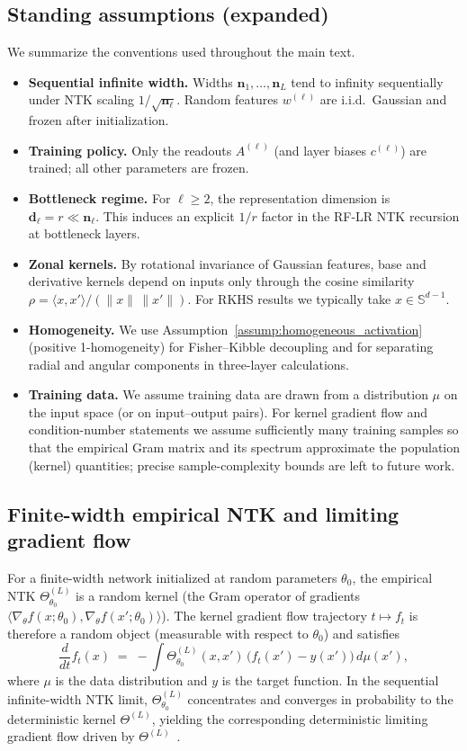 \subsection{Standing assumptions (expanded)}\label{appendix:assumptions-expanded}
We summarize the conventions used throughout the main text.
\begin{itemize}
    \item \textbf{Sequential infinite width.} Widths \(\bm{n}_1,\ldots,\bm{n}_L\) tend to infinity sequentially under NTK scaling \(1/\sqrt{\bm{n}_\ell}\). Random features \(w^{(\ell)}\) are i.i.d.\ Gaussian and frozen after initialization.
    \item \textbf{Training policy.} Only the readouts \(A^{(\ell)}\) (and layer biases \(c^{(\ell)}\)) are trained; all other parameters are frozen.
    \item \textbf{Bottleneck regime.} For \(\ell\ge 2\), the representation dimension is \(\bm{d}_\ell=r\ll \bm{n}_\ell\). This induces an explicit \(1/r\) factor in the RF-LR NTK recursion at bottleneck layers.
    \item \textbf{Zonal kernels.} By rotational invariance of Gaussian features, base and derivative kernels depend on inputs only through the cosine similarity \(\rho=\langle x,x'\rangle/(\|x\|\,\|x'\|)\). For RKHS results we typically take \(x\in\mathbb{S}^{d-1}\).
    \item \textbf{Homogeneity.} We use Assumption~\ref{assump:homogeneous_activation} (positive 1-homogeneity) for Fisher--Kibble decoupling and for separating radial and angular components in three-layer calculations.
    \item \textbf{Training data.} We assume training data are drawn from a distribution \(\mu\) on the input space (or on input--output pairs). For kernel gradient flow and condition-number statements we assume sufficiently many training samples so that the empirical Gram matrix and its spectrum approximate the population (kernel) quantities; precise sample-complexity bounds are left to future work.
\end{itemize}

\subsection{Finite-width empirical NTK and limiting gradient flow}\label{appendix:empirical-ntk-gradient-flow}
For a finite-width network initialized at random parameters \(\theta_0\), the empirical NTK \(\Theta^{(L)}_{\theta_0}\) is a random kernel (the Gram operator of gradients \(\langle \nabla_\theta f(x;\theta_0),\nabla_\theta f(x';\theta_0)\rangle\)). The kernel gradient flow trajectory \(t\mapsto f_t\) is therefore a random object (measurable with respect to \(\theta_0\)) and satisfies
\[
\frac{d}{dt}f_t(x) \;=\; -\int \Theta^{(L)}_{\theta_0}(x,x')\,\bigl(f_t(x')-y(x')\bigr)\,d\mu(x'),
\]
where \(\mu\) is the data distribution and \(y\) is the target function. In the sequential infinite-width NTK limit, \(\Theta^{(L)}_{\theta_0}\) concentrates and converges in probability to the deterministic kernel \(\Theta^{(L)}\), yielding the corresponding deterministic limiting gradient flow driven by \(\Theta^{(L)}\)~\cite{jacot2018neural}.

